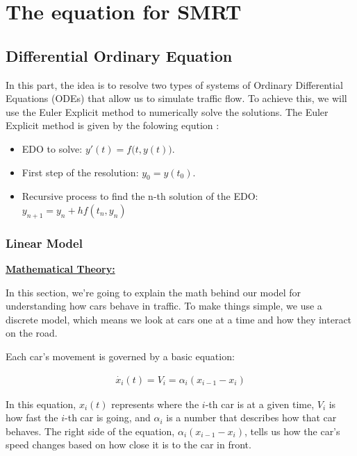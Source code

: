\documentclass{article}
\begin{document}
	\section{The equation for SMRT}
		\subsection{Differential Ordinary Equation }
		In this part, the idea is to resolve two types of systems of Ordinary Differential Equations (ODEs) that allow us to simulate traffic flow. To achieve this, we will use the Euler Explicit method to numerically solve the solutions.
		The Euler Explicit method is given by the folowing eqution :
		\begin{itemize}
			\item EDO to solve: $\boxed{y'(t) = f{\bigl (}t, y(t){\bigr )}}$.
			\item First step of the resolution: $\boxed{y_0 = y(t_0)}$.
			\item Recursive process to find the n-th solution of the EDO: $\boxed{y_{n+1} = y_{n} + hf(t_{n}, y_{n})}$
		\end{itemize}
		
		
		
		
		
		\subsubsection{Linear Model}
			\textbf{\underline{Mathematical Theory:}}
			\newline
			
			In this section, we're going to explain the math behind our model for understanding how cars behave in traffic. To make things simple, we use a discrete model, which means we look at cars one at a time and how they interact on the road.
			
			Each car's movement is governed by a basic equation:
			
			\begin{align*}
				\dot{x_i}(t) = V_i = \alpha_i(x_{i-1} - x_i)
			\end{align*}
			
			In this equation, \(x_i(t)\) represents where the \(i\)-th car is at a given time, \(V_i\) is how fast the \(i\)-th car is going, and \(\alpha_i\) is a number that describes how that car behaves. The right side of the equation, \(\alpha_i(x_{i-1} - x_i)\), tells us how the car's speed changes based on how close it is to the car in front.
			
\end{document}
